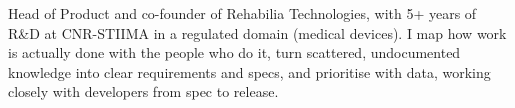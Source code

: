 {Head of Product and co-founder of Rehabilia Technologies, with 5+ years of R\&D at CNR-STIIMA in a regulated domain (medical devices). I map how work is actually done with the people who do it, turn scattered, undocumented knowledge into clear requirements and specs, and prioritise with data, working closely with developers from spec to release.}
